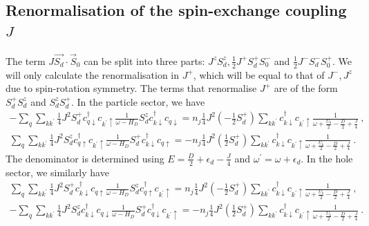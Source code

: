 \documentclass[reprint,superscriptaddress,floatfix]{revtex4-2}
\begin{document}
\begin{widetext}
\subsection{Renormalisation of the spin-exchange coupling \(J\)}
The term \(J \vec{S_d}\cdot\vec{S}_0\) can be split into three parts: \(J^z S_d^z, \frac{1}{2}J^+ S_d^+ S_0^-\) and \(\frac{1}{2}J^- S_d^- S_0^+\). We will only calculate the renormalisation in \(J^+\), which will be equal to that of \(J^-,J^z\) due to spin-rotation symmetry. The terms that renormalise \(J^+\) are of the form \(S_d^+ S_d^z\) and \(S_d^z S_d^+\). In the particle sector, we have
\begin{equation}\begin{aligned}
	-\sum_{q} \sum_{kk^\prime}\frac{1}{4}J^2 S_d^+ c^\dagger_{q\downarrow}c_{k^\prime \uparrow} \frac{1}{\omega - H_D}S_d^z c^\dagger_{k \downarrow}c_{q \downarrow} = n_j \frac{1}{4}J^2 \left(-\frac{1}{2}S_d^+\right) \sum_{kk^\prime}c^\dagger_{k \downarrow}c_{k^\prime \uparrow} \frac{1}{\omega + \frac{U_b}{2} - \frac{D}{2} + \frac{J}{4}}~,\\
	\sum_{q} \sum_{kk^\prime} \frac{1}{4}J^2 S_d^z c^\dagger_{q \uparrow}c_{k^\prime \uparrow} \frac{1}{\omega - H_D} S_d^+ c^\dagger_{k\downarrow}c_{q \uparrow} = -n_j \frac{1}{4}J^2 \left(\frac{1}{2}S_d^+\right) \sum_{kk^\prime}c^\dagger_{k \downarrow}c_{k^\prime \uparrow} \frac{1}{\omega + \frac{U_b}{2} - \frac{D}{2} + \frac{J}{4}}~.
\end{aligned}\end{equation}
The denominator is determined using \(E = \frac{D}{2} + \epsilon_d - \frac{J}{4}\) and \(\omega^\prime = \omega + \epsilon_d\).
In the hole sector, we similarly have
\begin{equation}\begin{aligned}
	\sum_{q} \sum_{kk^\prime}\frac{1}{4}J^2 S_d^+ c^\dagger_{k\downarrow}c_{q \uparrow} \frac{1}{\omega - H_D}S_d^z c^\dagger_{q \uparrow}c_{k^\prime \uparrow} = n_j \frac{1}{4}J^2 \left(-\frac{1}{2}S_d^+\right) \sum_{kk^\prime}c^\dagger_{k \downarrow}c_{k^\prime \uparrow} \frac{1}{\omega + \frac{U_b}{2} - \frac{D}{2} + \frac{J}{4}}~,\\
	-\sum_{q} \sum_{kk^\prime} \frac{1}{4}J^2 S_d^z c^\dagger_{k \downarrow}c_{q \downarrow} \frac{1}{\omega - H_D} S_d^+ c^\dagger_{q\downarrow}c_{k^\prime \uparrow} = -n_j \frac{1}{4}J^2 \left(\frac{1}{2}S_d^+\right) \sum_{kk^\prime}c^\dagger_{k \downarrow}c_{k^\prime \uparrow} \frac{1}{\omega + \frac{U_b}{2} - \frac{D}{2} + \frac{J}{4}}~.
\end{aligned}\end{equation}


\end{widetext}
\end{document}

